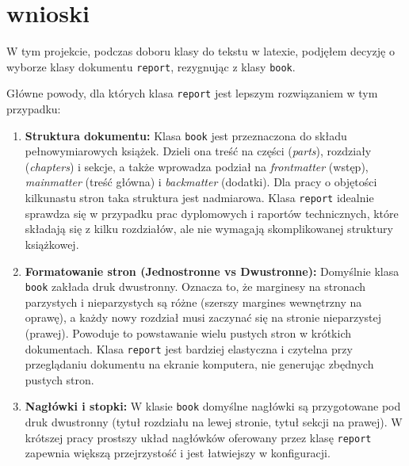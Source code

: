 \chapter{wnioski}

W tym projekcie, podczas doboru klasy do tekstu w latexie, podjęłem decyzję o wyborze klasy dokumentu \texttt{report}, rezygnując z klasy \texttt{book}.

Główne powody, dla których klasa \texttt{report} jest lepszym rozwiązaniem w tym przypadku:

\begin{enumerate}
    \item \textbf{Struktura dokumentu:} Klasa \texttt{book} jest przeznaczona do składu pełnowymiarowych książek. Dzieli ona treść na części (\textit{parts}), rozdziały (\textit{chapters}) i sekcje, a także wprowadza podział na \textit{frontmatter} (wstęp), \textit{mainmatter} (treść główna) i \textit{backmatter} (dodatki). Dla pracy o objętości kilkunastu stron taka struktura jest nadmiarowa. Klasa \texttt{report} idealnie sprawdza się w przypadku prac dyplomowych i raportów technicznych, które składają się z kilku rozdziałów, ale nie wymagają skomplikowanej struktury książkowej.
    
    \item \textbf{Formatowanie stron (Jednostronne vs Dwustronne):} Domyślnie klasa \texttt{book} zakłada druk dwustronny. Oznacza to, że marginesy na stronach parzystych i nieparzystych są różne (szerszy margines wewnętrzny na oprawę), a każdy nowy rozdział musi zaczynać się na stronie nieparzystej (prawej). Powoduje to powstawanie wielu pustych stron w krótkich dokumentach. Klasa \texttt{report} jest bardziej elastyczna i czytelna przy przeglądaniu dokumentu na ekranie komputera, nie generując zbędnych pustych stron.
    
    \item \textbf{Nagłówki i stopki:} W klasie \texttt{book} domyślne nagłówki są przygotowane pod druk dwustronny (tytuł rozdziału na lewej stronie, tytuł sekcji na prawej). W krótszej pracy prostszy układ nagłówków oferowany przez klasę \texttt{report} zapewnia większą przejrzystość i jest łatwiejszy w konfiguracji.
\end{enumerate}

